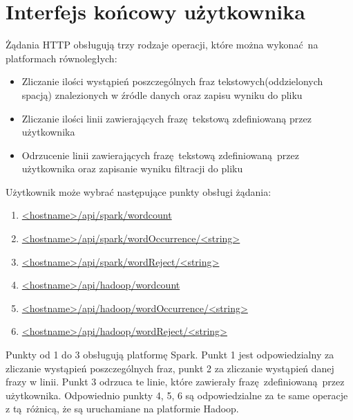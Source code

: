 \section{Interfejs końcowy użytkownika}
Żądania HTTP obsługują trzy rodzaje operacji, które można wykonać na platformach równoległych:
\begin{itemize}
	\item {Zliczanie ilości wystąpień poszczególnych fraz tekstowych(oddzielonych spacją) znalezionych w źródle danych oraz zapisu wyniku do pliku}
	\item {Zliczanie ilości linii zawierających frazę tekstową zdefiniowaną przez użytkownika}
	\item {Odrzucenie linii zawierających frazę tekstową zdefiniowaną przez użytkownika oraz zapisanie wyniku filtracji do pliku}
\end{itemize}
Użytkownik może wybrać następujące punkty obsługi żądania:
\begin{enumerate}
	\item{\url{<hostname>/api/spark/wordcount}}
	\item{\url{<hostname>/api/spark/wordOccurrence/<string> }}
	\item{\url{<hostname>/api/spark/wordReject/<string> }}
	\item{\url{<hostname>/api/hadoop/wordcount}}
	\item{\url{<hostname>/api/hadoop/wordOccurrence/<string>}}
	\item{\url{<hostname>/api/hadoop/wordReject/<string> }}
\end{enumerate}
Punkty od 1 do 3 obsługują platformę Spark. Punkt 1 jest odpowiedzialny za zliczanie wystąpień poszczególnych fraz, punkt 2 za zliczanie wystąpień danej frazy w linii. Punkt 3 odrzuca te linie, które zawierały frazę zdefiniowaną przez użytkownika. Odpowiednio punkty 4, 5, 6 są odpowiedzialne za te same operacje z tą różnicą, że są uruchamiane na platformie Hadoop.  

